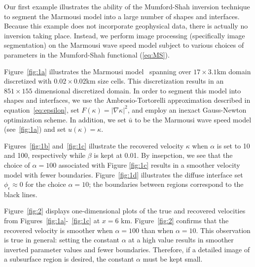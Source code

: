 \documentclass[manuscript,revised]{geophysics}
\begin{document}
Our first example illustrates the ability of the Mumford-Shah inversion technique to segment the Marmousi model into a large number of shapes and interfaces.  Because this example does not incorporate geophysical data, there is actually no inversion taking place.  Instead, we perform image processing (specifically image segmentation) on the Marmousi wave speed model subject to various choices of parameters in the Mumford-Shah functional  (\ref{eq:MS}).

Figure~\ref{fig:1a} illustrates the Marmousi model~\cite[]{Marmousi2} spanning over $17\times3.1$km domain discretized with $0.02\times0.02$km size cells. This discretization results in an $851\times155$ dimensional discretized domain. In order to segment this model into shapes and interfaces, we use the Ambrosio-Tortorelli approximation described in equation~\ref{eq:epsilon}, set $F(\kappa)=\left\vert \nabla \kappa \right\vert^2$, and employ an inexact Gauss-Newton optimization scheme.  In addition, we set $\bar{u}$ to be the Marmousi wave speed model (see~\ref{fig:1a}) and set $u(\kappa)=\kappa$. 

Figures~\ref{fig:1b} and~\ref{fig:1c} illustrate the recovered velocity $\kappa$ when $\alpha$ is set to 10 and 100, respectively while $\beta$ is kept at 0.01. By insepction, we see that the choice of $\alpha = 100$ associated with Figure \ref{fig:1c} results in a smoother velocity model with fewer boundaries. Figure~\ref{fig:1d} illustrates the diffuse interface set $\phi_\epsilon \approx 0$ for the choice $\alpha = 10$; the boundaries between regions correspond to the black lines.

Figure~\ref{fig:2} displays one-dimensional plots of the true and recovered velocities from Figures~\ref{fig:1a}-~\ref{fig:1c} at $x = 6$ km. Figure~\ref{fig:2} confirms that the recovered velocity is smoother when $\alpha = 100$ than when $\alpha = 10$. This observation is true in general: setting the constant $\alpha$ at a high value results in smoother inverted parameter values and fewer boundaries. Therefore, if a detailed image of a subsurface region is desired, the constant $\alpha$ must be kept small. 
\end{document}
